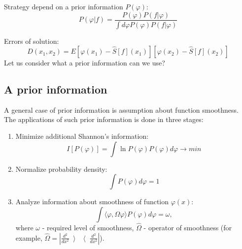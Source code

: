 \documentclass{webofc}
\begin{document}
Strategy depend on a prior information $P(\varphi)$:
\begin{equation*}
	P(\varphi|f)= \frac{P(\varphi)P(f|\varphi)}{\int d\varphi P(\varphi)P(f|\varphi)} 
\end{equation*}

Errors of solution:
\begin{equation*}
	D(x_1,x_2)  = E[\varphi(x_1) - \hat{S}[f](x_1)][\varphi(x_2) - \hat{S}[f](x_2)]
\end{equation*}
Let us consider what a prior information can we use? 

\subsection{A prior information}\label{sec:theory:aprior}

A general case of prior information is assumption about function smoothness. The applications of such prior information is done in three stages:
\begin{enumerate}
\item Minimize additional Shannon's information:
	\begin{equation*}
		I[P(\varphi)] = \int \ln{P(\varphi)} P(\varphi) d\varphi \to min
	\end{equation*}
\item Normalize probability density:
	\begin{equation*}
		\int P(\varphi) d\varphi = 1
	\end{equation*}   
\item Analyze information about smoothness of function $\varphi(x)$:
	\begin{equation}
		\label{eq-smoothness}
		\int \langle \varphi,\hat{\Omega}\varphi \rangle P(\varphi) d\varphi = \omega,
	\end{equation}
where $\omega$ - required level of smoothness,   $\hat{\Omega}$ - operator of smoothness (for example, $\hat{\Omega}=|\frac{d^2}{dx^2}\left\rangle\right\langle\frac{d^2}{dx^2}|$).
\end{enumerate}
\end{document}
